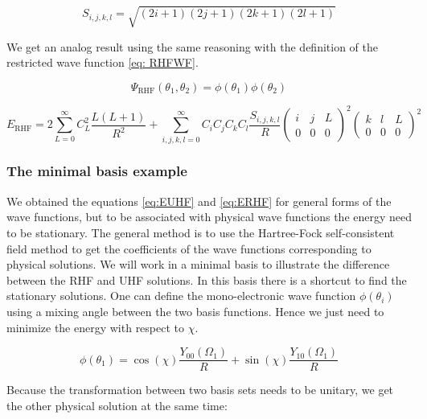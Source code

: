 \documentclass[11pt,a4paper]{article}
\begin{document}
{\begin{equation*}
S_{i,j,k,l}=\sqrt{(2i+1)(2j+1)(2k+1)(2l+1)}
\end{equation*}

We get an analog result using the same reasoning with the definition of the restricted wave function \eqref{eq: RHFWF}.

\begin{equation}
\Psi_{\text{RHF}}(\theta_1,\theta_2)=\phi(\theta_1)\phi(\theta_2)
\label{eq: RHFWF}
\end{equation}

\begin{equation}
E_{\text{RHF}} = 2 \sum\limits_{L=0}^{\infty} C_L^2 \frac{L(L+1)}{R^2} + \sum\limits_{i,j,k,l=0}^{\infty}C_iC_jC_kC_l\frac{S_{i,j,k,l}}{R} \begin{pmatrix}
 i & j & L \\
 0 & 0 & 0
\end{pmatrix}^2 \begin{pmatrix}
 k & l & L \\
 0 & 0 & 0
\end{pmatrix}^2
\label{eq:ERHF}
\end{equation}

\subsubsection{The minimal basis example}

We obtained the equations \eqref{eq:EUHF} and \eqref{eq:ERHF} for general forms of the wave functions, but to be associated with physical wave functions the energy need to be stationary. The general method is to use the Hartree-Fock self-consistent field method to get the coefficients of the wave functions corresponding to physical solutions. We will work in a minimal basis to illustrate the difference between the RHF and UHF solutions. In this basis there is a shortcut to find the stationary solutions. One can define the mono-electronic wave function $\phi(\theta_i)$ using a mixing angle between the two basis functions. Hence we just need to minimize the energy with respect to $\chi$.

\begin{equation}
\phi(\theta_1)= \cos(\chi)\frac{Y_{00}(\Omega_1)}{R} + \sin(\chi)\frac{Y_{10}(\Omega_1)}{R}
\end{equation}

Because the transformation between two basis sets needs to be unitary, we get the other physical solution at the same time:

}
\end{document}
